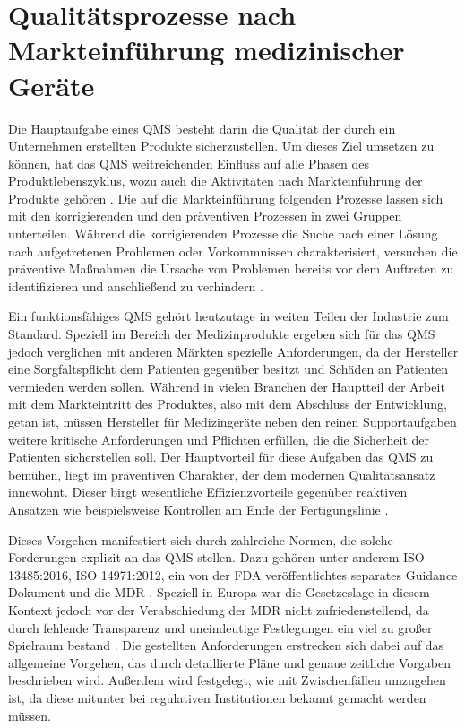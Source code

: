 \documentclass[a4paper,12pt]{report}
\begin{document}
\section{Qualitätsprozesse nach Markteinführung medizinischer Geräte}\label{sec:PMProzesse}
Die Hauptaufgabe eines \ac{QMS} besteht darin die Qualität der durch ein Unternehmen erstellten Produkte sicherzustellen. Um dieses Ziel umsetzen zu können, hat das \ac{QMS} weitreichenden Einfluss auf alle Phasen des Produktlebenszyklus, wozu auch die Aktivitäten nach Markteinführung der Produkte gehören \citep[vgl.][S. 13]{Cheng2003}. Die auf die Markteinführung folgenden Prozesse lassen sich mit den korrigierenden und den präventiven Prozessen in zwei Gruppen unterteilen. Während die korrigierenden Prozesse die Suche nach einer Lösung nach aufgetretenen Problemen oder Vorkommnissen charakterisiert, versuchen die präventive Maßnahmen die Ursache von Problemen bereits vor dem Auftreten zu identifizieren und anschließend zu verhindern \citep[vgl.][S. 338-350]{Abuhav2012}.

Ein funktionsfähiges \ac{QMS} gehört heutzutage in weiten Teilen der Industrie zum Standard. Speziell im Bereich der Medizinprodukte ergeben sich für das QMS jedoch verglichen mit anderen Märkten spezielle Anforderungen, da der Hersteller eine Sorgfaltspflicht dem Patienten gegenüber besitzt und Schäden an Patienten vermieden werden sollen. Während in vielen Branchen der Hauptteil der Arbeit mit dem Markteintritt des Produktes, also mit dem Abschluss der Entwicklung, getan ist, müssen Hersteller für Medizingeräte neben den reinen Supportaufgaben weitere kritische Anforderungen und Pflichten erfüllen, die die Sicherheit der Patienten sicherstellen soll. Der Hauptvorteil für diese Aufgaben das QMS zu bemühen, liegt im präventiven Charakter, der dem modernen Qualitätsansatz innewohnt. Dieser birgt wesentliche Effizienzvorteile gegenüber reaktiven Ansätzen wie beispielsweise Kontrollen am Ende der Fertigungslinie \citep[vgl.][S. 14]{Cheng2003}.

Dieses Vorgehen manifestiert sich durch zahlreiche Normen, die solche Forderungen explizit an das QMS stellen. Dazu gehören unter anderem ISO 13485:2016, ISO 14971:2012, ein von der FDA veröffentlichtes separates Guidance Dokument und die MDR \citep[vgl.][]{Johner2017}. Speziell in Europa war die Gesetzeslage in diesem Kontext jedoch vor der Verabschiedung der MDR nicht zufriedenstellend, da durch fehlende Transparenz und uneindeutige Festlegungen ein viel zu großer Spielraum bestand \citep[vgl.][S. 1]{Chowdhury2014}. Die gestellten Anforderungen erstrecken sich dabei auf das allgemeine Vorgehen, das durch detaillierte Pläne und genaue zeitliche Vorgaben beschrieben wird. Außerdem wird festgelegt, wie mit Zwischenfällen umzugehen ist, da diese mitunter bei regulativen Institutionen bekannt gemacht werden müssen.
\end{document}
